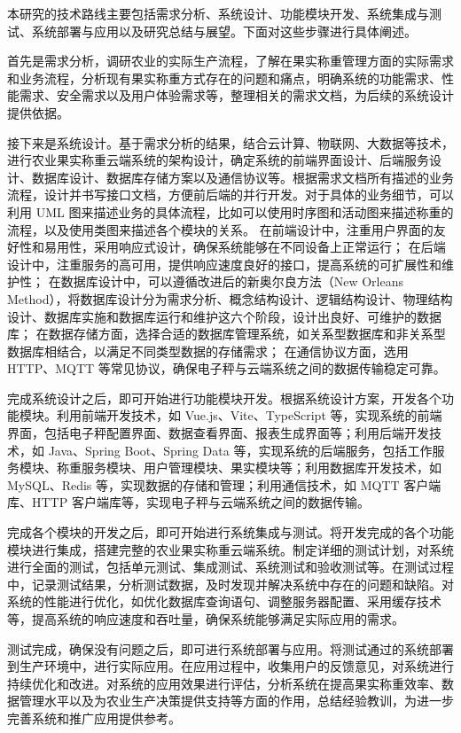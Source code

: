 \documentclass{xduugthesis}
\begin{document}
本研究的技术路线主要包括需求分析、系统设计、功能模块开发、系统集成与测试、系统部署与应用以及研究总结与展望。下面对这些步骤进行具体阐述。

首先是需求分析，调研农业的实际生产流程，了解在果实称重管理方面的实际需求和业务流程，分析现有果实称重方式存在的问题和痛点，明确系统的功能需求、性能需求、安全需求以及用户体验需求等，整理相关的需求文档，为后续的系统设计提供依据。

接下来是系统设计。基于需求分析的结果，结合云计算、物联网、大数据等技术，进行农业果实称重云端系统的架构设计，确定系统的前端界面设计、后端服务设计、数据库设计、数据库存储方案以及通信协议等。根据需求文档所有描述的业务流程，设计并书写接口文档，方便前后端的并行开发。对于具体的业务细节，可以利用 UML 图来描述业务的具体流程，比如可以使用时序图和活动图来描述称重的流程，以及使用类图来描述各个模块的关系。
在前端设计中，注重用户界面的友好性和易用性，采用响应式设计，确保系统能够在不同设备上正常运行；
在后端设计中，注重服务的高可用，提供响应速度良好的接口，提高系统的可扩展性和维护性；
在数据库设计中，可以遵循改进后的新奥尔良方法（New Orleans Method），将数据库设计分为需求分析、概念结构设计、逻辑结构设计、物理结构设计、数据库实施和数据库运行和维护这六个阶段，设计出良好、可维护的数据库\cite{苗雪兰2001数据库系统原理及应用教程}；
在数据存储方面，选择合适的数据库管理系统，如关系型数据库和非关系型数据库相结合，以满足不同类型数据的存储需求；
在通信协议方面，选用 HTTP、MQTT 等常见协议，确保电子秤与云端系统之间的数据传输稳定可靠。

完成系统设计之后，即可开始进行功能模块开发。根据系统设计方案，开发各个功能模块。利用前端开发技术，如 Vue.js、Vite、TypeScript 等，实现系统的前端界面，包括电子秤配置界面、数据查看界面、报表生成界面等；利用后端开发技术，如 Java、Spring Boot、Spring Data 等，实现系统的后端服务，包括工作服务模块、称重服务模块、用户管理模块、果实模块等；利用数据库开发技术，如 MySQL、Redis 等，实现数据的存储和管理；利用通信技术，如 MQTT 客户端库、HTTP 客户端库等，实现电子秤与云端系统之间的数据传输。

完成各个模块的开发之后，即可开始进行系统集成与测试。将开发完成的各个功能模块进行集成，搭建完整的农业果实称重云端系统。制定详细的测试计划，对系统进行全面的测试，包括单元测试、集成测试、系统测试和验收测试等。在测试过程中，记录测试结果，分析测试数据，及时发现并解决系统中存在的问题和缺陷。对系统的性能进行优化，如优化数据库查询语句、调整服务器配置、采用缓存技术等，提高系统的响应速度和吞吐量，确保系统能够满足实际应用的需求。

测试完成，确保没有问题之后，即可进行系统部署与应用。将测试通过的系统部署到生产环境中，进行实际应用。在应用过程中，收集用户的反馈意见，对系统进行持续优化和改进。对系统的应用效果进行评估，分析系统在提高果实称重效率、数据管理水平以及为农业生产决策提供支持等方面的作用，总结经验教训，为进一步完善系统和推广应用提供参考。
\end{document}
